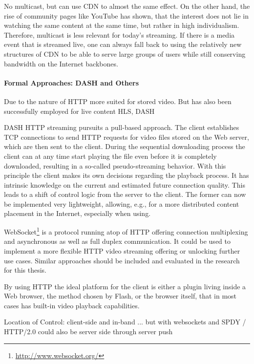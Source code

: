 No multicast, but can use CDN to almost the same effect.
	On the other hand, the rise of community pages like YouTube has shown, that the interest does not lie in watching the same content at the same time, but rather in high individualism. Therefore, multicast is less relevant for today's streaming. If there is a media event that is streamed live, one can always fall back to using the relatively new structures of \gls{CDN} to be able to serve large groups of users while still conserving bandwidth on the Internet backbones.


\paragraph{Formal Approaches: DASH and Others}

Due to the nature of \gls{HTTP} more suited for stored video. But has also been successfully employed for live content \gls{HLS}, \gls{DASH}

\gls{DASH}
\gls{HTTP} streaming pursuits a pull-based approach. The client establishes \gls{TCP} connections to send \gls{HTTP} requests for video files stored on the Web server, which are then sent to the client. During the sequential downloading process the client can at any time start playing the file even before it is completely downloaded, resulting in a so-called pseudo-streaming behavior.
With this principle the client makes its own decisions regarding the playback process. It has intrinsic knowledge on the current and estimated future connection quality. This leads to a shift of control logic from the server to the client. The former can now be implemented very lightweight, allowing, e.g., for a more distributed content placement in the Internet, especially when using.

WebSocket\footnote{\url{http://www.websocket.org/}} \cite{ietf2011websocket} is a protocol running atop of \gls{HTTP} offering connection multiplexing and asynchronous as well as full duplex communication. It could be used to implement a more flexible \gls{HTTP} video streaming offering or unlocking further use cases. Similar approaches should be included and evaluated in the research for this thesis.

By using \gls{HTTP} the ideal platform for the client is either a plugin living inside a Web browser, the method chosen by Flash, or the browser itself, that in most cases has built-in video playback capabilities.

Location of Control: client-side and in-band ... but with websockets and SPDY / HTTP/2.0 could also be server side through server push

